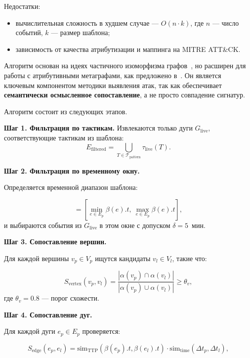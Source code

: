 \documentclass{article}
\begin{document}
Недостатки:

\noindent
\begin{itemize}
    \item вычислительная сложность в худшем случае — $O(n \cdot k)$, где $n$ — число событий, $k$ — размер шаблона;
    \item зависимость от качества атрибутизации и маппинга на MITRE ATT\&CK.
\end{itemize}

Алгоритм основан на идеях частичного изоморфизма графов~\cite{Sheyner2002}, но расширен для работы с атрибутивными метаграфами, как предложено в~\cite{Latypov2020}. Он является ключевым компонентом методики выявления атак, так как обеспечивает \textbf{семантически осмысленное сопоставление}, а не просто совпадение сигнатур.

Алгоритм состоит из следующих этапов.

\textbf{Шаг 1. Фильтрация по тактикам.}
Извлекаются только дуги $G_{\text{live}}$, соответствующие тактикам из шаблона:
\begin{equation}
    E_{\text{filtered}} = \bigcup_{T \in \mathcal{T}_{\text{pattern}}} \tau_{\text{live}}(T).
    \label{eq:filter_tactics}
\end{equation}

\textbf{Шаг 2. Фильтрация по временному окну.}

Определяется временной диапазон шаблона:

\begin{equation}
    [t_{\min}, t_{\max}] = \left[ \min_{e \in E_p} \beta(e).t,\ \max_{e \in E_p} \beta(e).t \right],
    \label{eq:time_window}
\end{equation}
и выбираются события из $G_{\text{live}}$ в этом окне с допуском $\delta = 5$~мин.

\textbf{Шаг 3. Сопоставление вершин.}

Для каждой вершины $v_p \in V_p$ ищутся кандидаты $v_l \in V_l$, такие что:

\begin{equation}
    S_{\text{vertex}}(v_p, v_l) = \frac{|\alpha(v_p) \cap \alpha(v_l)|}{|\alpha(v_p) \cup \alpha(v_l)|} \geq \theta_v,
    \label{eq:vertex_sim}
\end{equation}
где $\theta_v = 0.8$ — порог схожести.

\textbf{Шаг 4. Сопоставление дуг.}

Для каждой дуги $e_p \in E_p$ проверяется:

\begin{equation}
    S_{\text{edge}}(e_p, e_l) = \text{sim}_{\text{TTP}}(\beta(e_p).t, \beta(e_l).t) \cdot \text{sim}_{\text{time}}(\Delta t_p, \Delta t_l),
    \label{eq:edge_sim}
\end{equation}
\end{document}
